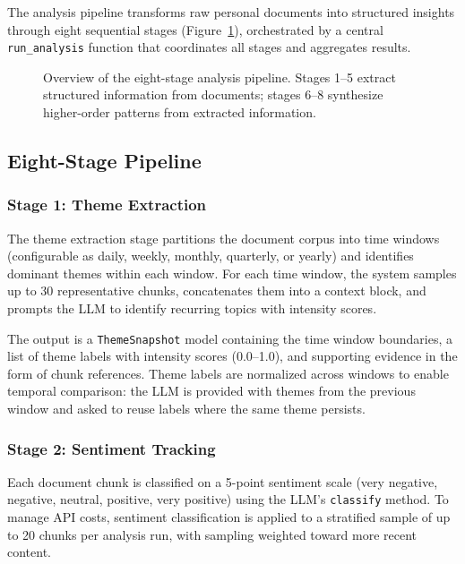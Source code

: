 \documentclass[manuscript,review]{acmart}
\begin{document}
The analysis pipeline transforms raw personal documents into structured insights through eight sequential stages (Figure~\ref{fig:pipeline}), orchestrated by a central \texttt{run\_analysis} function that coordinates all stages and aggregates results.

\begin{figure}[t]
  \centering
  \caption{Overview of the eight-stage analysis pipeline. Stages 1--5 extract structured information from documents; stages 6--8 synthesize higher-order patterns from extracted information.}
  \label{fig:pipeline}
\end{figure}

\subsection{Eight-Stage Pipeline}
\label{sec:eight-stages}

\subsubsection{Stage 1: Theme Extraction}
The theme extraction stage partitions the document corpus into time windows (configurable as daily, weekly, monthly, quarterly, or yearly) and identifies dominant themes within each window.
For each time window, the system samples up to 30 representative chunks, concatenates them into a context block, and prompts the LLM to identify recurring topics with intensity scores.

The output is a \texttt{ThemeSnapshot} model containing the time window boundaries, a list of theme labels with intensity scores (0.0--1.0), and supporting evidence in the form of chunk references.
Theme labels are normalized across windows to enable temporal comparison: the LLM is provided with themes from the previous window and asked to reuse labels where the same theme persists.

\subsubsection{Stage 2: Sentiment Tracking}
Each document chunk is classified on a 5-point sentiment scale (very negative, negative, neutral, positive, very positive) using the LLM's \texttt{classify} method.
To manage API costs, sentiment classification is applied to a stratified sample of up to 20 chunks per analysis run, with sampling weighted toward more recent content.
\end{document}
